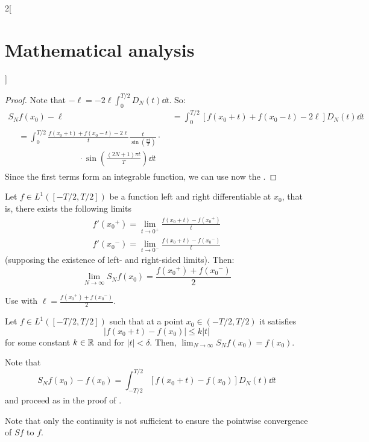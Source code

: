 \documentclass[../../../main_math.tex]{subfiles}
\begin{document}
\begin{multicols}{2}[\section{Mathematical analysis}]
\begin{theorem}
  \end{theorem}
  \begin{proof}
    Note that $-\ell=-2\ell\int_{0}^{T/2}D_N(t)\dd{t}$. So:
    \begin{align*}
      S_Nf(x_0)-\ell & =\int_0^{T/2}[f(x_0+t)+f(x_0-t) - 2\ell]D_N(t)\dd{t} \\
      \begin{split}
        &=\int_{0}^{T/2}\frac{f(x_0+t)+f(x_0-t) - 2\ell}{t}\frac{t}{\sin\left(\frac{\pi t}{T}\right)}\cdot\\
        &\hspace{3cm}\cdot\sin\left(\frac{(2N+1)\pi t}{T}\right)\dd{t}
      \end{split}
    \end{align*}
    Since the first terms form an integrable function, we can use now the .
  \end{proof}
  \begin{corollary}
    Let $f\in L^1([-T/2,T/2])$ be a function left and right differentiable at $x_0$, that is, there exists the following limits
    \begin{gather*}
      f'({x_0}^+)=\lim_{t\to0^+}\frac{f(x_0+t)-f({x_0}^+)}{t}\\
      f'({x_0}^-)=\lim_{t\to0^-}\frac{f(x_0+t)-f({x_0}^-)}{t}
    \end{gather*}(supposing the existence of left- and right-sided limits). Then: $$\lim_{N\to\infty}S_Nf(x_0)=\frac{f({x_0}^+)+f({x_0}^-)}{2}$$
  \end{corollary}
  \begin{sproof}
    Use  with $\ell=\frac{f({x_0}^+)+f({x_0}^-)}{2}$.
  \end{sproof}
  \begin{theorem}
    Let $f\in L^1([-T/2,T/2])$ such that at a point $x_0\in (-T/2,T/2)$ it satisfies $$|f(x_0+t)-f(x_0)|\leq k|t|$$ for some constant $k\in\mathbb{R} $ and for $|t|<\delta$. Then, $\displaystyle\lim_{N\to\infty}S_Nf(x_0)=f(x_0)$.
  \end{theorem}
  \begin{sproof}
    Note that
    $$S_Nf(x_0)-f(x_0) =\int_{-T/2}^{T/2}[f(x_0+t) - f(x_0)]D_N(t)\dd{t}$$
    and proceed as in the proof of .
  \end{sproof}
  \begin{remark}
    Note that only the continuity is not sufficient to ensure the pointwise convergence of $Sf$ to $f$.
  \end{remark}

\end{multicols}
\end{document}
